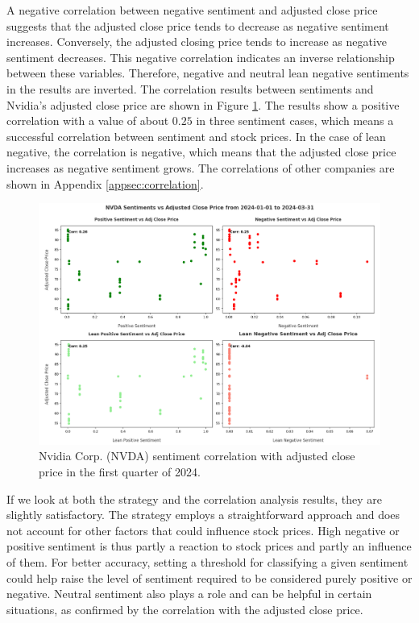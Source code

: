 A negative correlation between negative sentiment and adjusted close price suggests that the adjusted close price tends to decrease as negative sentiment increases. Conversely, the adjusted closing price tends to increase as negative sentiment decreases. This negative correlation indicates an inverse relationship between these variables. Therefore, negative and neutral lean negative sentiments in the results are inverted. The correlation results between sentiments and Nvidia's adjusted close price are shown in Figure \ref{fig:elsa-experiment-stock-nvda-corr}. The results show a positive correlation with a value of about $0.25$ in three sentiment cases, which means a successful correlation between sentiment and stock prices. In the case of lean negative, the correlation is negative, which means that the adjusted close price increases as negative sentiment grows. The correlations of other companies are shown in Appendix \ref{appsec:correlation}.

\begin{figure}[ht]
    \centering
    \includegraphics[width=\textwidth]{img/experiment-stock/nvda-corr-a.pdf}
    \caption{Nvidia Corp. (NVDA) sentiment correlation with adjusted close price in the first quarter of 2024.}
    \label{fig:elsa-experiment-stock-nvda-corr}
\end{figure}

If we look at both the strategy and the correlation analysis results, they are slightly satisfactory. The strategy employs a straightforward approach and does not account for other factors that could influence stock prices. High negative or positive sentiment is thus partly a reaction to stock prices and partly an influence of them. For better accuracy, setting a threshold for classifying a given sentiment could help raise the level of sentiment required to be considered purely positive or negative. Neutral sentiment also plays a role and can be helpful in certain situations, as confirmed by the correlation with the adjusted close price.

